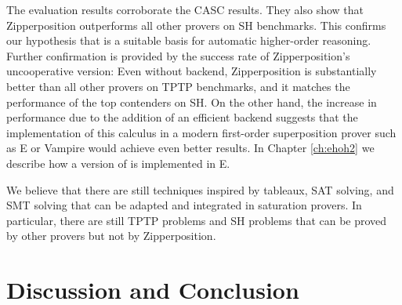
The evaluation results corroborate the CASC results. They also
show that Zipperposition outperforms all other provers on SH benchmarks. This
confirms our hypothesis that \osup{} is a suitable basis for automatic
higher-order reasoning. Further confirmation is provided by the success rate of
Zipperposition's uncooperative version: Even without backend,
Zipperposition is substantially better than all other provers on TPTP
benchmarks, and it matches the performance of the top contenders on SH.
On the other hand, the increase in performance due to the addition
of an efficient backend suggests that the implementation of this calculus in a
modern first-order superposition prover such as E or Vampire would achieve
even better results. In Chapter \ref{ch:ehoh2} we describe how a version of \osup{}
is implemented in E.

We believe that there are still techniques inspired by
tableaux, SAT solving, and SMT solving that can be adapted and integrated in
saturation provers. In particular, there are still  TPTP problems
and  SH problems that can be proved by other provers but not by
Zipperposition.

\section{Discussion and Conclusion}
\label{sec:ho-tech:discussion}


